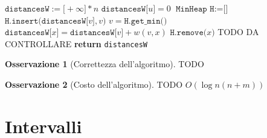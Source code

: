 \documentclass[14pt]{extreport}
\theoremstyle{definition}
\theoremstyle{definition}
\newtheorem{remark}{Osservazione}[subsection]
\begin{document}
\begin{algorithm}[H]
    \caption{
        Dato un grafo pesato $G$ attraverso $w$, e $u \in V(G)$ un suo vertice, l'algoritmo restituisce le distanze pesate dei vertici di $G$ da $u$; l'algoritmo assume che ogni vertice di $G$ sia raggiungibile da $u$, e che ogni peso definito da $w$ sia strettamente positivo.\\
        \textbf{Input}: $G$ grafo, e $u$ un suo vertice tale che per ogni $x \in V(G)$ esiste un cammino della forma $u \rightarrow x$; $w$ una funzione che associa pesi agli archi in $E(G)$, tale che ogni peso sia strettamente positivo.\\
        \textbf{Output}: le distanze dei vertici di $G$ da $u$.
    }

    \begin{algorithmic}[1]
            \State $\texttt{distancesW} := \texttt{[}+ \infty \texttt{]} * n$ 
            \State $\texttt{distancesW[}u\texttt{]} = 0$
            \State $\texttt{MinHeap H} := \texttt{[]}$ 
                \State $\texttt{H.insert(distancesW[}v\texttt{]},v\texttt{)}$
            \EndFor
                \State $v = \texttt{H.get\_min()}$
                        \State $\texttt{distancesW[}x\texttt{]}=\texttt{distancesW[}v\texttt{]} + w(v, x)$
                        \State $\texttt{H.remove(}x\texttt{)}$ TODO DA CONTROLLARE
                    \EndIf
                \EndFor
            \EndWhile
            \State \textbf{return} \texttt{distancesW}
        \EndFunction
    \end{algorithmic}
\end{algorithm}

\begin{remark}[Correttezza dell'algoritmo]
    TODO
\end{remark}

\begin{remark}[Costo dell'algoritmo]
    TODO $O(\log n(n + m))$
\end{remark}

\section{Intervalli}
\end{document}
